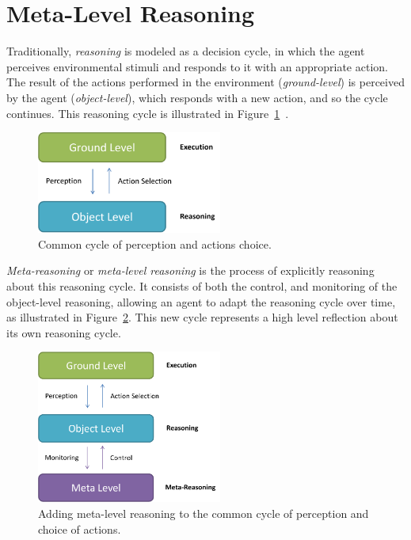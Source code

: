 \section{Meta-Level Reasoning}
\label{sec:meta-reasoning}

Traditionally, \textit{reasoning} is modeled as a decision cycle, in which the agent perceives environmental stimuli and responds to it with an appropriate action. 
The result of the actions performed in the environment (\textit{ground-level})
is perceived by the agent (\textit{object-level}), which responds with a new action,
and so the cycle continues. 
This reasoning cycle is illustrated in Figure~\ref{fig:reasoning}~\cite{cox2007metareasoning}. 

\begin{figure}[ht]
\centering
\includegraphics[width=230px]{images/reasoning}
\caption{Common cycle of perception and actions choice.}
\label{fig:reasoning}
\end{figure}

\textit{Meta-reasoning} or \textit{meta-level reasoning} is the process of explicitly reasoning about this reasoning cycle. 
It consists of both the control, and monitoring of the object-level reasoning, allowing an agent to adapt the reasoning cycle over time, as illustrated in Figure~\ref{fig:metareasoning}. 
This new cycle represents a high level reflection about its own reasoning cycle. 

\begin{figure}[ht]
\centering
\includegraphics[width=230px]{images/metareasoning}
\caption{Adding meta-level reasoning to the common cycle of perception and choice of actions.}
\label{fig:metareasoning}
\end{figure}


